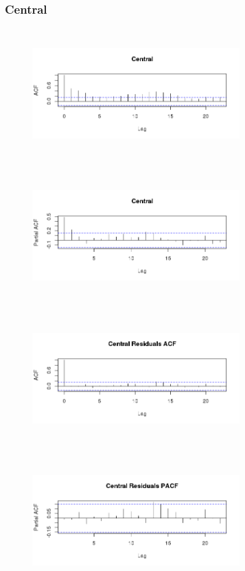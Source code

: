 \documentclass{article} %
\begin{document}
\subsubsection{Central}
 \begin{multicols}{2}
\begin{figure}[H]
\includegraphics[height=50mm, width=80mm]{Plots/Central_ACF.png}
\end{figure}
 
\begin{figure}[H]
\includegraphics[height=50mm, width=80mm]{Plots/Central_PACF.png}
\end{figure}
 
\begin{figure}[H]
\includegraphics[height=50mm, width=80mm]{Plots/Central_resid_ACF.png}
\end{figure}
 
\begin{figure}[H]
\includegraphics[height=50mm, width=80mm]{Plots/Central_resid_PACF.png}
\end{figure}
 \end{multicols}
\end{document}
